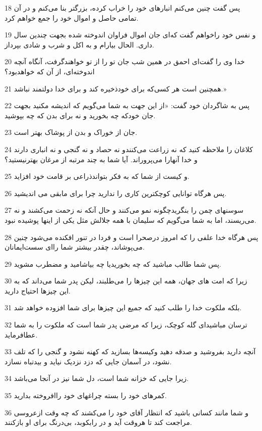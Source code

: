\par 18 پس گفت چنین می‌کنم انبارهای خود را خراب کرده، بزرگتر بنا می‌کنم و در آن تمامی حاصل و اموال خود را جمع خواهم کرد.
\par 19 و نفس خود راخواهم گفت که‌ای جان اموال فراوان اندوخته شده بجهت چندین سال داری. الحال بیارام و به اکل و شرب و شادی بپرداز.
\par 20 خدا وی را گفت‌ای احمق در همین شب جان تو را از تو خواهندگرفت، آنگاه آنچه اندوخته‌ای، از آن که خواهدبود؟
\par 21 همچنین است هر کسی‌که برای خودذخیره کند و برای خدا دولتمند نباشد.»
\par 22 پس به شاگردان خود گفت: «از این جهت به شما می‌گویم که اندیشه مکنید بجهت جان خودکه چه بخورید و نه برای بدن که چه بپوشید.
\par 23 جان از خوراک و بدن از پوشاک بهتر است.
\par 24 کلاغان را ملاحظه کنید که نه زراعت می‌کنندو نه حصاد و نه گنجی و نه انباری دارند و خدا آنهارا می‌پروراند. آیا شما به چند مرتبه از مرغان بهترنیستید؟
\par 25 و کیست از شما که به فکر بتواندذراعی بر قامت خود افزاید.
\par 26 پس هرگاه توانایی کوچکترین کاری را ندارید چرا برای مابقی می اندیشید.
\par 27 سوسنهای چمن را بنگریدچگونه نمو می‌کنند و حال آنکه نه زحمت می‌کشند و نه می‌ریسند، اما به شما می‌گویم که سلیمان با همه جلالش مثل یکی از اینها پوشیده نبود.
\par 28 پس هرگاه خدا علفی را که امروز درصحرا است و فردا در تنور افکنده می‌شود چنین می‌پوشاند، چقدر بیشتر شما را‌ای سست‌ایمانان.
\par 29 پس شما طالب مباشید که چه بخوریدیا چه بیاشامید و مضطرب مشوید.
\par 30 زیرا که امت های جهان، همه این چیزها را می‌طلبند، لیکن پدر شما می‌داند که به این چیزها احتیاج دارید.
\par 31 بلکه ملکوت خدا را طلب کنید که جمیع این چیزها برای شما افزوده خواهد شد.
\par 32 ترسان مباشید‌ای گله کوچک، زیرا که مرضی پدر شما است که ملکوت را به شما عطافرماید.
\par 33 آنچه دارید بفروشید و صدقه دهید وکیسه‌ها بسازید که کهنه نشود و گنجی را که تلف نشود، در آسمان جایی که دزد نزدیک نیاید و بیدتباه نسازد.
\par 34 زیرا جایی که خزانه شما است، دل شما نیز در آنجا می‌باشد.
\par 35 کمرهای خود را بسته چراغهای خود راافروخته بدارید.
\par 36 و شما مانند کسانی باشید که انتظار آقای خود را می‌کشند که چه وقت ازعروسی مراجعت کند تا هروقت آید و در رابکوبد، بی‌درنگ برای او بازکنند.
